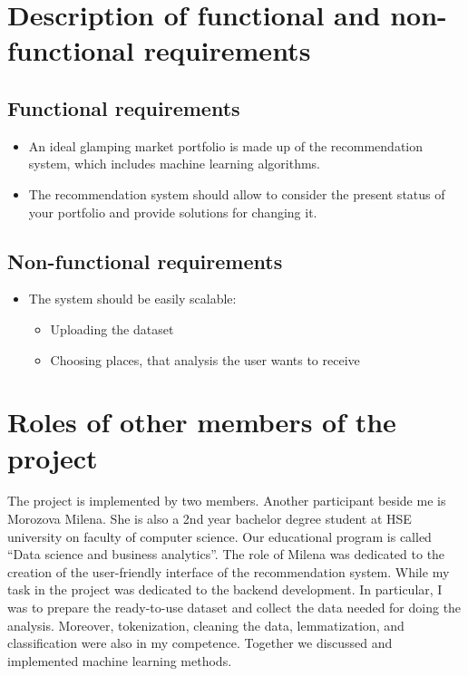 \documentclass{article}
\begin{document}
\newpage
\section{Description of functional and non-functional requirements}
\subsection{Functional requirements}
\setcounter{section}{6}
\begin{itemize}
    \item An ideal glamping market portfolio is made up of the recommendation system, which includes machine learning algorithms.
    \item The recommendation system should allow to consider the present status of your portfolio and provide solutions for changing it.
\end{itemize}

\subsection{Non-functional requirements}
\setcounter{section}{6}
\begin{itemize}
    \item The system should be easily scalable:
    \begin{itemize}
        \item Uploading the dataset
        \item Choosing places, that analysis the user wants to receive
    \end{itemize}
\end{itemize}
\section{Roles of other members of the project}
The project is implemented by two members. Another participant beside me is Morozova Milena. She is also a 2nd year bachelor degree student at HSE university on faculty of computer science. Our educational program is called “Data science and business analytics”. The role of Milena was dedicated to the creation of the user-friendly interface of the recommendation system. While my task in the project was dedicated to the backend development. In particular, I was to prepare the ready-to-use dataset and collect the data needed for doing the analysis. Moreover, tokenization, cleaning the data, lemmatization, and classification were also in my competence. Together we discussed and implemented machine learning methods.
\end{document}
